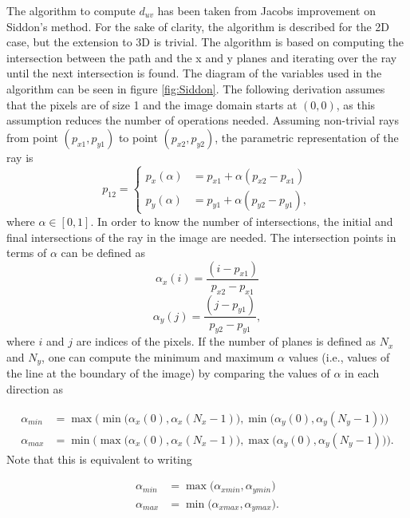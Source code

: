 The algorithm to compute $d_{uv}$ has been taken from Jacobs\cite{jacobs1998fast} improvement on Siddon's method\cite{siddon1985fast}. For the sake of clarity, the algorithm is described for the 2D case, but the extension to 3D is trivial. The algorithm is based on computing the intersection between the path and the x and y planes and iterating over the ray until the next intersection is found. The diagram of the variables used in the algorithm can be seen in figure \ref{fig:Siddon}. The following derivation assumes that the pixels are of size 1 and the image domain starts at $(0,0)$, as this assumption reduces the number of operations needed. Assuming non-trivial rays from point $(p_{x1},p_{y1})$ to point $(p_{x2},p_{y2})$, the parametric representation of the ray is
\begin{equation}
p_{12}=
\begin{cases}
      p_x(\alpha)&=p_{x1}+\alpha (p_{x2}-p_{x1})\\
      p_y(\alpha)&=p_{y1}+\alpha (p_{y2}-p_{y1}),\label{eq:line}
    \end{cases}
\end{equation}
where $\alpha \in [0,1]$. In order to know the number of intersections, the initial and final intersections of the ray in the image are needed. The intersection points in terms of $\alpha$ can be defined as
\begin{equation}
\alpha_x(i) = \frac{(i-p_{x1})}{p_{x2}-p_{x1}}\label{eq:alphax}
\end{equation}
\begin{equation}
\alpha_y(j) = \frac{(j-p_{y1})}{p_{y2}-p_{y1}},\label{eq:alphay}
\end{equation}
where $i$ and $j$ are indices of the pixels. If the number of planes is defined as $N_x$ and $N_y$, one can compute the minimum and maximum $\alpha$ values (i.e., values of the line at the boundary of the image) by comparing the values of $\alpha$ in each direction as

\begin{align}
\alpha_{min}&=\max \Big(\min \big(\alpha_x(0),\alpha_x(N_x-1)  \big), \min \big(\alpha_y(0),\alpha_y(N_y-1)  \big) \Big)\\
\alpha_{max}&=\min \Big(\max \big(\alpha_x(0),\alpha_x(N_x-1)  \big), \max \big(\alpha_y(0),\alpha_y(N_y-1)  \big) \Big).
\end{align}
Note that this is equivalent to writing

\begin{align}
\alpha_{min}&=\max \Big( \alpha_{xmin},\alpha_{ymin} \Big)\\
\alpha_{max}&=\min \Big( \alpha_{xmax},\alpha_{ymax}\Big).
\end{align}

